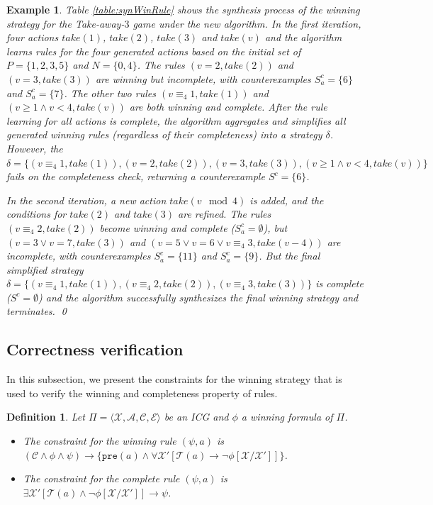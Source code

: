 \documentclass[review]{elsarticle}
\newcommand{\set}[1]{\{ #1 \}}
\newcommand{\tuple}[1]{\langle {#1} \rangle}
\newcommand{\statevar}{\mathcal{X}}
\newcommand{\act}{\mathcal{A}}
\newcommand{\trans}{\mathcal{T}}
\newcommand{\constraint}{\mathcal{C}}
\newcommand{\estate}{\mathcal{E}}
\newcommand{\pre}{\mathtt{pre}}
\newcommand{\modulo}{\equiv}
\newcommand{\red}{\color{red}}
\newtheorem{definition}{Definition}
\newtheorem{example}{Example}
\begin{document}
{\red \begin{example} \rm
    Table \ref{table:synWinRule} shows the synthesis process of the winning strategy for the Take-away-$3$ game under the new algorithm. 
	In the first iteration, four actions $take(1)$, $take(2)$, $take(3)$ and $take(v)$ and the algorithm learns rules for the four generated actions based on the initial set of $P=\{1, 2, 3,5\} $ and  $N=\{0, 4\}$.
	The rules $(v = 2, take(2))$ and $(v = 3, take(3))$ are winning but incomplete, with counterexamples $S^c_a = \{6\}$ and $S^c_a = \{7\}$. 
	The other two rules $(v \modulo_4 1, take(1))$ and $(v \geq 1 \land v < 4, take(v))$ are both winning and complete.
	After the rule learning for all actions is complete, the algorithm aggregates and simplifies all generated winning rules (regardless of their completeness) into a strategy $\delta$.	 
	However, the $\delta = \set{(v \modulo_4 1, take(1)), (v = 2, take(2)), (v = 3, take(3)), (v \geq 1 \land v < 4, take(v))}$ fails on the completeness check, returning a counterexample $S^c=\{6\}$.

    In the second iteration, a new action $take(v \mod 4)$ is added, and the conditions for $take(2)$ and $take(3)$ are refined.
	The rules $(v \modulo_4 2, take(2))$ become winning and complete ($S^c_a=\emptyset$), but $(v = 3 \vee v = 7, take(3))$ and $(v = 5 \vee v = 6 \vee v \modulo_4 3, take(v - 4))$ are incomplete, with counterexamples $S^c_a = \{11\}$ and $S^c_a = \{9\}$. 
	But the final simplified strategy $\delta = \set{(v \modulo_4 1, take(1)), (v \modulo_4 2, take(2)), (v \modulo_4 3, take(3))}$ is complete ($S^c=\emptyset$)  and the algorithm successfully synthesizes the final winning strategy and terminates. \qed
\end{example}}	

\subsection{Correctness verification} \label{sec:winStrCorVer}
In this subsection, we present the constraints for the winning strategy that is used to verify the winning and completeness property of rules.

\begin{definition} \label{def:consWinRule} \rm
	Let $\Pi = \tuple{\statevar, \act, \constraint, \estate}$ be an ICG and $\phi$ a winning formula of $\Pi$.
	\begin{itemize}
		\item The constraint for the winning rule $(\psi, a)$ is $(\constraint \land \phi \land \psi) \rightarrow \{\pre(a) \land \forall \statevar' [\trans(a) \rightarrow \neg \phi[\statevar/\statevar']]\}$.
		
		\item The constraint for the complete rule $(\psi, a)$ is $\exists \statevar' [\trans(a) \land \neg \phi[\statevar/\statevar']] \rightarrow \psi$.
	\end{itemize}		
\end{definition}
\end{document}
